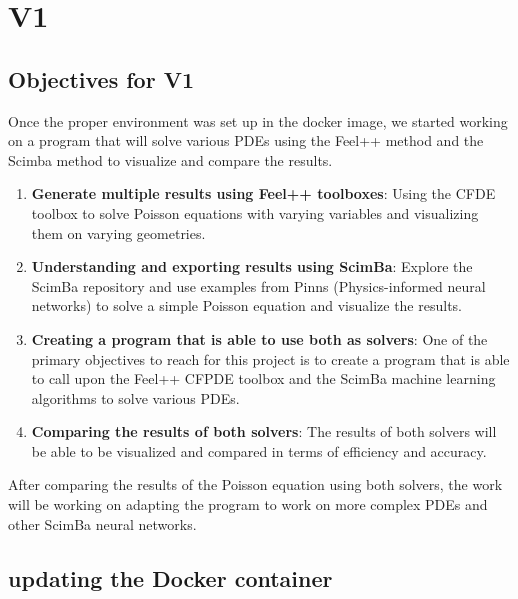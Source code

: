 \documentclass[12pt]{article}
\begin{document}
\newpage
\section{V1}  

\subsection{Objectives for V1}

Once the proper environment was set up in the docker image, we started working on a program that will solve various PDEs using the Feel++ method and the Scimba method to visualize and compare the results. 

\begin{enumerate}
    \item \textbf{Generate multiple results using Feel++ toolboxes}: Using the CFDE toolbox to solve Poisson equations with varying variables and visualizing them on varying geometries.
    
    \item \textbf{Understanding and exporting results using ScimBa}: Explore the ScimBa repository and use examples from Pinns (Physics-informed neural networks) to solve a simple Poisson equation and visualize the results.
    
    \item \textbf{Creating a program that is able to use both as solvers}: One of the primary objectives to reach for this project is to create a program that is able to call upon the Feel++ CFPDE toolbox and the ScimBa machine learning algorithms to solve various PDEs.
    
    \item \textbf{Comparing the results of both solvers}: The results of both solvers will be able to be visualized and compared in terms of efficiency and accuracy.
\end{enumerate}

After comparing the results of the Poisson equation using both solvers, the work will be working on adapting the program to work on more complex PDEs and other ScimBa neural networks. 




\newpage
\subsection{updating the Docker container}
\end{document}
